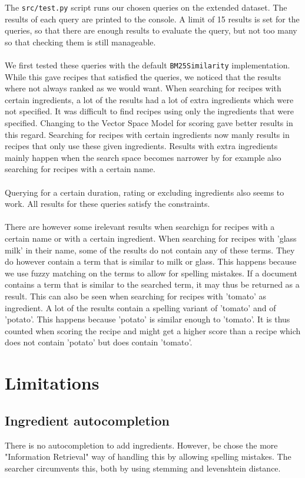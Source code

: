 \documentclass{article}
\begin{document}
The \texttt{src/test.py} script runs our chosen queries on the extended dataset.
The results of each query are printed to the console.
A limit of 15 results is set for the queries,
so that there are enough results to evaluate the query,
but not too many so that checking them is still manageable.
\\~\\
We first tested these queries with the default \texttt{BM25Similarity} implementation.
While this gave recipes that satisfied the queries,
we noticed that the results where not always ranked as we would want.
When searching for recipes with certain ingredients,
a lot of the results had a lot of extra ingredients which were not specified.
It was difficult to find recipes using only the ingredients that were specified.
Changing to the Vector Space Model for scoring gave better results in this regard.
Searching for recipes with certain ingredients now manly results in recipes
that only use these given ingredients.
Results with extra ingredients mainly happen when the search space becomes
narrower by for example also searching for recipes with a certain name.
\\~\\
Querying for a certain duration, rating or excluding ingredients also seems to work.
All results for these queries satisfy the constraints.
\\~\\
There are however some irelevant results when searchign for recipes with
a certain name or with a certain ingredient.
When searching for recipes with 'glass milk' in their name,
some of the results do not contain any of these terms.
They do however contain a term that is similar to milk or glass.
This happens because we use fuzzy matching on the terms to allow for spelling mistakes.
If a document contains a term that is similar to the searched term,
it may thus be returned as a result.
This can also be seen when searching for recipes with 'tomato' as ingredient.
A lot of the results contain a spelling variant of 'tomato' and of 'potato'.
This happens because 'potato' is similar enough to 'tomato'.
It is thus counted when scoring the recipe and might get a higher score than
a recipe which does not contain 'potato' but does contain 'tomato'.

\section{Limitations}
\subsection{Ingredient autocompletion}
There is no autocompletion to add ingredients. However, be chose the more
"Information Retrieval" way of handling this by allowing spelling mistakes.
The searcher circumvents this, both by using stemming and levenshtein distance.
\end{document}
